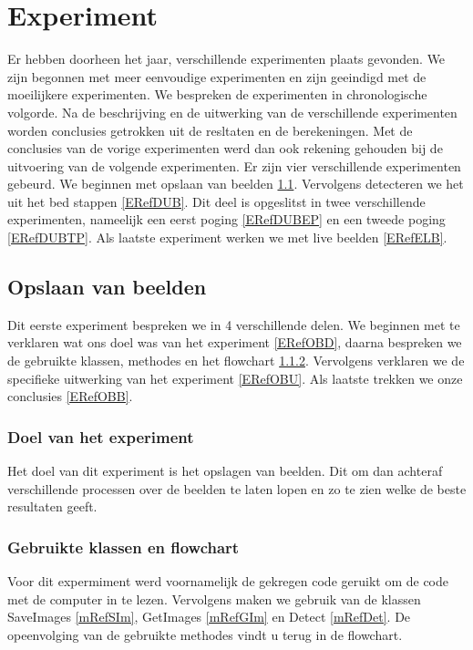 \chapter{Experiment}
\label{ERef}
Er hebben doorheen het jaar, verschillende experimenten plaats gevonden. We zijn begonnen met meer eenvoudige experimenten en zijn geeindigd met de moeilijkere experimenten. We bespreken de experimenten in chronologische volgorde. Na de beschrijving en de uitwerking van de verschillende experimenten worden conclusies getrokken uit de resltaten en de berekeningen. Met de conclusies van de vorige experimenten werd dan ook rekening gehouden bij de uitvoering van de volgende experimenten. Er zijn vier verschillende experimenten gebeurd. We beginnen met opslaan van beelden \ref{ERefOvB}. Vervolgens detecteren we het uit het bed stappen \ref{ERefDUB}. Dit deel is opgeslitst in twee verschillende experimenten, nameelijk een eerst poging \ref{ERefDUBEP} en een tweede poging \ref{ERefDUBTP}. Als laatste experiment werken we met live beelden \ref{ERefELB}.

\section{Opslaan van beelden}
\label{ERefOvB}
Dit eerste experiment bespreken we in 4 verschillende delen. We beginnen met te verklaren wat ons doel was van het experiment \ref{ERefOBD}, daarna bespreken we de gebruikte klassen, methodes en het flowchart \ref{ERefOBF}. Vervolgens verklaren we de specifieke uitwerking van het experiment \ref{ERefOBU}. Als laatste trekken we onze conclusies \ref{ERefOBB}.

\subsection{Doel van het experiment}
Het doel van dit experiment is het opslagen van beelden. Dit om dan achteraf verschillende processen over de beelden te laten lopen en zo te zien welke de beste resultaten geeft.
\label{ERefOBD}

\subsection{Gebruikte klassen en flowchart}
\label{ERefOBF}
Voor dit expermiment werd voornamelijk de gekregen code geruikt om de code met de computer in te lezen. Vervolgens maken we gebruik van de klassen SaveImages \ref{mRefSIm}, GetImages \ref{mRefGIm} en Detect \ref{mRefDet}. De opeenvolging van de gebruikte methodes vindt u terug in de flowchart. 

